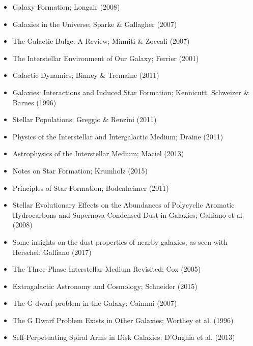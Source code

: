 \documentclass[a4paper,10pt]{article}
\begin{document}
\begin{itemize}
    \item Galaxy Formation; Longair (2008)
    \item Galaxies in the Universe; Sparke \& Gallagher (2007)
    \item The Galactic Bulge: A Review; Minniti \& Zoccali (2007)
    \item The Interstellar Environment of Our Galaxy; Ferrier (2001)
    \item Galactic Dynamics; Binney \& Tremaine (2011)
    \item Galaxies: Interactions and Induced Star Formation; Kennicutt, Schweizer \& Barnes (1996)
    \item Stellar Populations; Greggio \& Renzini (2011)
    \item Physics of the Interstellar and Intergalactic Medium; Draine (2011)
    \item Astrophysics of the Interstellar Medium; Maciel (2013)
    \item Notes on Star Formation; Krumholz (2015)
    \item Principles of Star Formation; Bodenheimer (2011)
    \item Stellar Evolutionary Effects on the Abundances of Polycyclic Aromatic Hydrocarbons and Supernova-Condensed Dust in Galaxies; Galliano et al. (2008)
    \item Some insights on the dust properties of nearby galaxies, as seen with Herschel; Galliano (2017)
    \item The Three Phase Interstellar Medium Revisited; Cox (2005)
    \item Extragalactic Astronomy and Cosmology; Schneider (2015)
    \item The G-dwarf problem in the Galaxy; Caimmi (2007)
    \item The G Dwarf Problem Exists in Other Galaxies; Worthey et al. (1996)
    \item Self-Perpetuating Spiral Arms in Disk Galaxies; D'Onghia et al. (2013)
\end{itemize}
\end{document}
